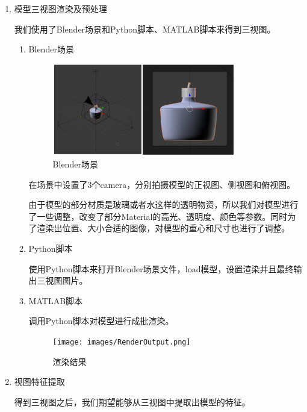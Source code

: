 \documentclass{article}
\begin{document}
\begin{enumerate}
    \item 模型三视图渲染及预处理

我们使用了Blender场景和Python脚本、MATLAB脚本来得到三视图。
    \begin{enumerate}

    \item Blender场景
    
    \begin{figure}[htb]
    \centering
    \includegraphics[width=0.8\textwidth]{images/Blender.png}
    \caption{Blender场景}\label{fig:digit}
    \end{figure} 
        
    \qquad 在场景中设置了3个camera，分别拍摄模型的正视图、侧视图和俯视图。
    
    \qquad 由于模型的部分材质是玻璃或者水这样的透明物资，所以我们对模型进行了一些调整，改变了部分Material的高光、透明度、颜色等参数。同时为了渲染出位置、大小合适的图像，对模型的重心和尺寸也进行了调整。


    \item Python脚本
    
    \qquad 使用Python脚本来打开Blender场景文件，load模型，设置渲染并且最终输出三视图图片。
    
    \item MATLAB脚本
    
    \qquad 调用Python脚本对模型进行成批渲染。
    
\begin{figure}[hb]
\centering
\texttt{[image: images/RenderOutput.png]}
\caption{渲染结果}\label{fig:digit}
\end{figure} 
    
    \end{enumerate}
    
    
    \item 视图特征提取
    
    \qquad 得到三视图之后，我们期望能够从三视图中提取出模型的特征。
    

\end{enumerate}
\end{document}
